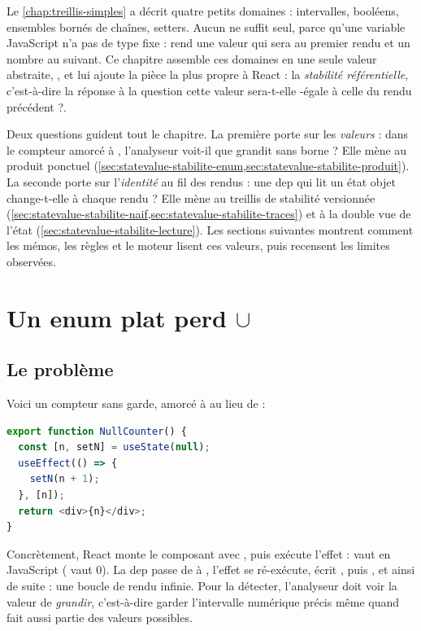 Le \cref{chap:treillis-simples} a décrit quatre petits domaines : intervalles,
booléens, ensembles bornés de chaînes, setters. Aucun ne suffit seul, parce
qu'une variable JavaScript n'a pas de type fixe :  rend
une valeur qui sera  au premier rendu et un nombre au suivant. Ce
chapitre assemble ces domaines en une seule valeur abstraite,
, et lui ajoute la pièce la plus propre à React : la
\emph{stabilité référentielle}, c'est-à-dire la réponse à la question
\og cette valeur sera-t-elle -égale à celle du rendu
précédent ?\fg{}.

Deux questions guident tout le chapitre. La première porte sur les
\emph{valeurs} : dans le compteur  amorcé à ,
l'analyseur voit-il que  grandit sans borne ? Elle mène au produit
ponctuel (\cref{sec:statevalue-stabilite-enum,sec:statevalue-stabilite-produit}).
La seconde porte sur l'\emph{identité} au fil des rendus : une dep qui lit un
état objet change-t-elle à chaque rendu ? Elle mène au treillis de stabilité
versionnée (\cref{sec:statevalue-stabilite-naif,sec:statevalue-stabilite-traces})
et à la double vue de l'état (\cref{sec:statevalue-stabilite-lecture}). Les
sections suivantes montrent comment les mémos, les règles et le moteur lisent
ces valeurs, puis recensent les limites observées.

\section{Un enum plat perd  $\cup$ }
\label{sec:statevalue-stabilite-enum}

\subsection{Le problème}

Voici un compteur sans garde, amorcé à  au lieu de  :

\begin{lstlisting}[language=TypeScript,caption={Un compteur nullable (\file{/tmp/ch10/nullable.tsx}, extrait)},label={lst:statevalue-stabilite-nullcounter}]
export function NullCounter() {
  const [n, setN] = useState(null);
  useEffect(() => {
    setN(n + 1);
  }, [n]);
  return <div>{n}</div>;
}
\end{lstlisting}

Concrètement, React monte le composant avec , puis exécute
l'effet :  vaut  en JavaScript (
vaut $0$). La dep  passe de  à , l'effet se
ré-exécute, écrit , puis , et ainsi de suite : une boucle de
rendu infinie. Pour la détecter, l'analyseur doit voir la valeur de
 \emph{grandir}, c'est-à-dire garder l'intervalle numérique précis
même quand  fait aussi partie des valeurs possibles.

